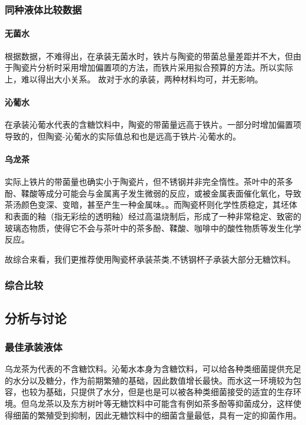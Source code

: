 \documentclass[12pt,a4paper]{ctexart}
\begin{document}
\subsubsection{同种液体比较数据}
\paragraph{无菌水}

根据数据，不难得出，在承装无菌水时，铁片与陶瓷的带菌总量差距并不大，但由于陶瓷片分析时采用增加偏置项的方法，而铁片采用拟合预算的方法。所以实际上，难以得出大小关系。
故对于水的承装，两种材料均可，并无影响。


\paragraph{沁葡水}
在承装沁葡水代表的含糖饮料中，陶瓷的带菌量远高于铁片。一部分时增加偏置项导致的，但陶瓷-沁葡水的实际值总和也是远高于铁片-沁葡水的。

\paragraph{乌龙茶}
实际上铁片的带菌量也确实小于陶瓷片，但不锈钢并非完全惰性。茶叶中的茶多酚、鞣酸等成分可能会与金属离子发生微弱的反应，或被金属表面催化氧化，导致茶汤颜色变深、变暗，甚至产生一种金属味。\cite{JSHJ201504002}。而陶瓷杯则化学性质稳定，其坯体和表面的釉（指无彩绘的透明釉）经过高温烧制后，形成了一种非常稳定、致密的玻璃态物质，使得它不会与茶叶中的茶多酚、鞣酸、咖啡中的酸性物质等发生化学反应。 

故综合来看，我们更推荐使用陶瓷杯承装茶类,不锈钢杯子承装大部分无糖饮料。



\subsubsection{综合比较}
\subsection{分析与讨论}
\subsubsection{最佳承装液体}
乌龙茶为代表的不含糖饮料。沁葡水本身为含糖饮料，可以给各种类细菌提供充足的水分以及糖分，作为前期繁殖的基础，因此数值增长最快。而水这一环境较为包容，也较为基础，只提供了水分，但是也是可以被各种类细菌接受的适宜的生存环境。但乌龙茶以及东方树叶等无糖饮料中可能含有例如茶多酚等抑菌成分，这样使得细菌的繁殖受到抑制，因此无糖饮料中的细菌含量最低，具有一定的抑菌作用。
\end{document}
